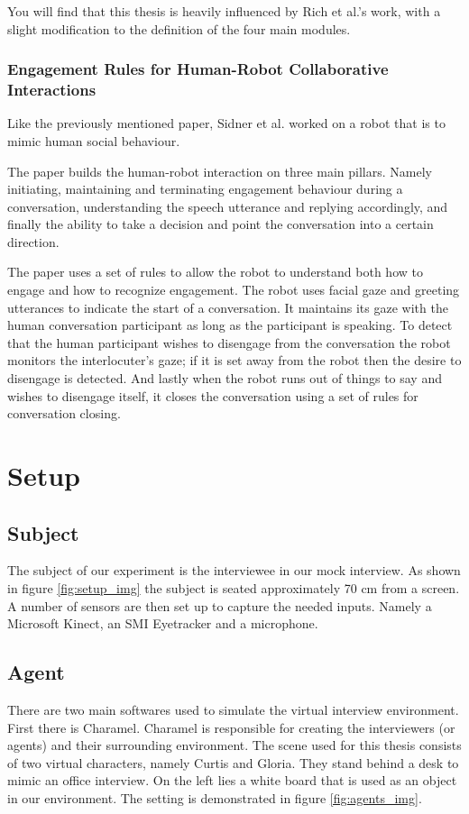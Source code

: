 \documentclass[12pt, a4paper, fleqn]{memoir}%
\begin{document}
You will find that this thesis is heavily influenced by Rich et al.'s work, with a slight modification to the definition of the four main modules.

\subsection{Engagement Rules for Human-Robot Collaborative Interactions}
Like the previously mentioned paper, Sidner et al. \cite{sidner} worked on a robot that is to mimic human social behaviour.

The paper builds the human-robot interaction on three main pillars. Namely initiating, maintaining and terminating engagement behaviour during a conversation, understanding the speech utterance and replying accordingly, and finally the ability to take a decision and point the conversation into a certain direction.

The paper uses a set of rules to allow the robot to understand both how to engage and how to recognize engagement. The robot uses facial gaze and greeting utterances to indicate the start of a conversation. It maintains its gaze with the human conversation participant as long as the participant is speaking. To detect that the human participant wishes to disengage from the conversation the robot monitors the interlocuter's gaze; if it is set away from the robot then the desire to disengage is detected. And lastly when the robot runs out of things to say and wishes to disengage itself, it closes the conversation using a set of rules for conversation closing.

\chapter{Setup}
\label{chap:Section}

\section{Subject}
\label{sec:Subject}
The subject of our experiment is the interviewee in our mock interview. As shown in figure \ref{fig:setup_img} the subject is seated approximately 70 cm from a screen. A number of sensors are then set up to capture the needed inputs. Namely a Microsoft Kinect, an SMI Eyetracker and a microphone.

\section{Agent}
\label{sec:Agent}
There are two main softwares used to simulate the virtual interview environment. First there is Charamel. Charamel is responsible for creating the interviewers (or agents) and their surrounding environment. The scene used for this thesis consists of two virtual characters, namely Curtis and Gloria. They stand behind a desk to mimic an office interview. On the left lies a white board that is used as an object in our environment. The setting is demonstrated in figure \ref{fig:agents_img}.
\end{document}
